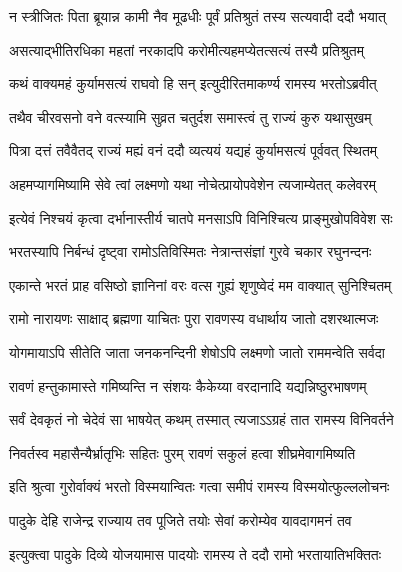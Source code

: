 
\twolineshloka
{न स्त्रीजितः पिता ब्रूयान्न कामी नैव मूढधीः}
{पूर्वं प्रतिश्रुतं तस्य सत्यवादी ददौ भयात्} %

\twolineshloka
{असत्याद्भीतिरधिका महतां नरकादपि}
{करोमीत्यहमप्येतत्सत्यं तस्यै प्रतिश्रुतम्} %

\twolineshloka
{कथं वाक्यमहं कुर्यामसत्यं राघवो हि सन्}
{इत्युदीरितमाकर्ण्य रामस्य भरतोऽब्रवीत्} %


\twolineshloka
{तथैव चीरवसनो वने वत्स्यामि सुव्रत}
{चतुर्दश समास्त्वं तु राज्यं कुरु यथासुखम्} %


\twolineshloka
{पित्रा दत्तं तवैवैतद् राज्यं मह्यं वनं ददौ}
{व्यत्ययं यद्यहं कुर्यामसत्यं पूर्ववत् स्थितम्} %

\twolineshloka
{अहमप्यागमिष्यामि सेवे त्वां लक्ष्मणो यथा}
{नोचेत्प्रायोपवेशेन त्यजाम्येतत् कलेवरम्} %

\twolineshloka
{इत्येवं निश्चयं कृत्वा दर्भानास्तीर्य चातपे}
{मनसाऽपि विनिश्चित्य प्राङ्मुखोपविवेश सः} %

\twolineshloka
{भरतस्यापि निर्बन्धं दृष्ट्वा रामोऽतिविस्मितः}
{नेत्रान्तसंज्ञां गुरवे चकार रघुनन्दनः} %

\twolineshloka
{एकान्ते भरतं प्राह वसिष्ठो ज्ञानिनां वरः}
{वत्स गुह्यं शृणुष्वेदं मम वाक्यात् सुनिश्चितम्} %

\twolineshloka
{रामो नारायणः साक्षाद् ब्रह्मणा याचितः पुरा}
{रावणस्य वधार्थाय जातो दशरथात्मजः} %

\twolineshloka
{योगमायाऽपि सीतेति जाता जनकनन्दिनी}
{शेषोऽपि लक्ष्मणो जातो राममन्वेति सर्वदा} %

\twolineshloka
{रावणं हन्तुकामास्ते गमिष्यन्ति न संशयः}
{कैकेय्या वरदानादि यद्यन्निष्ठुरभाषणम्} %

\twolineshloka
{सर्वं देवकृतं नो चेदेवं सा भाषयेत् कथम्}
{तस्मात् त्यजाऽऽग्रहं तात रामस्य विनिवर्तने} %

\twolineshloka
{निवर्तस्व महासैन्यैर्भ्रातृभिः सहितः पुरम्}
{रावणं सकुलं हत्वा शीघ्रमेवागमिष्यति} %

\twolineshloka
{इति श्रुत्वा गुरोर्वाक्यं भरतो विस्मयान्वितः}
{गत्वा समीपं रामस्य विस्मयोत्फुल्ललोचनः} %

\twolineshloka
{पादुके देहि राजेन्द्र राज्याय तव पूजिते}
{तयोः सेवां करोम्येव यावदागमनं तव} %

\twolineshloka
{इत्युक्त्वा पादुके दिव्ये योजयामास पादयोः}
{रामस्य ते ददौ रामो भरतायातिभक्तितः} %

